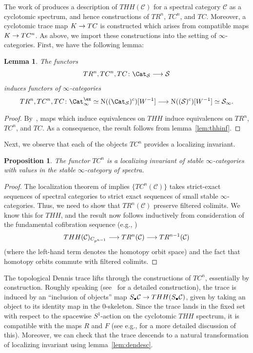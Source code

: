 \documentclass{amsart}
\newcommand{\ssdot}{\bullet}%
\newcommand{\Sdot}[1][\ssdot]{S_{#1}}
\newcommand{\htp}{\simeq}
\renewcommand{\to}{\mathchoice{\longrightarrow}{\rightarrow}{\rightarrow}{\rightarrow}}
\let\catsymbfont\mathcal
\newcommand{\aC}{{\catsymbfont{C}}}
\newcommand{\aS}{{\catsymbfont{S}}}
\newcommand{\N}{\mathrm{N}}
\newcommand{\stabcat}{\Cat_\i^{\ex}}
\newcommand{\ispec}{\aS_{\infty}}
\newcommand{\Spcat}{\Cat_\mathcal{S}}%
\newcommand{\Spt}{\mathcal{S}}%
\renewcommand{\i}{\infty}
\numberwithin{equation}{section}
\newtheorem{lemma}[equation]{Lemma}
\newtheorem{proposition}[equation]{Proposition}
\theoremstyle{definition}
\begin{document}
The work of \cite[\S 5]{BM} produces a description of $THH(\aC)$ for
a spectral category $\aC$ as a cyclotomic spectrum, and hence
constructions of $TR^n$, $TC^n$, and $TC$.  Moreover, a cyclotomic
trace map $K \to TC$ is constructed which arises from compatible maps
$K \to TC^n$.  As above, we import these constructions into the
setting of $\i$-categories.  First, we have the following lemma:

\begin{lemma}
The functors
\[
TR^n, TC^n, TC \colon \Spcat \to \Spt
\]
induces functors of $\i$-categories
\[
TR^n, TC^n, TC \colon \stabcat \htp \N((\Spcat)^{\mathrm{c}})[W^{-1}] \to \N((\Spt)^{\mathrm{c}})[W^{-1}] \htp \ispec.
\]
\end{lemma}

\begin{proof}
By~\cite[3.9]{BM}, maps which induce equivalences on $THH$ induce
equivalences on $TR^n$, $TC^n$, and $TC$.  As a consequence, the
result follows from lemma~\ref{lem:thhinf}. 
\end{proof}

Next, we observe that each of the objects $TC^{n}$ provides a
localizing invariant.

\begin{proposition}
The functor $TC^{n}$ is a localizing invariant of stable
$\i$-categories with values in the stable $\i$-category of spectra.
\end{proposition}

\begin{proof}
The localization theorem of \cite[7.1]{BM} implies $\{TC^{n}(\aC)\}$
takes strict-exact sequences of spectral categories to strict exact
sequences of small stable $\i$-categories.  Thus, we need to show that
$TR^n(\aC)$ preserve filtered colimits.  We know this for $THH$, and
the result now follows inductively from consideration of the
fundamental cofibration sequence (e.g., \cite[2.1.4]{Hesselholt})
\[
THH(\aC)_{C_{p^{n-1}}} \to TR^{n}(\aC) \to TR^{n-1}(\aC)
\]
(where the left-hand term denotes the homotopy orbit space) and the
fact that homotopy orbits commute with filtered colimits.
\end{proof}

The topological Dennis trace lifts through the constructions of
$TC^{n}$, essentially by construction.  Roughly speaking
(see~\cite[5.12]{BM2} for a detailed construction), the trace is
induced by an ``inclusion of objects'' map  $\Sdot \aC \to
THH(\Sdot \aC)$, given by taking an object to its identity map in the
0-skeleton.  Since the trace lands in the fixed set with respect
to the spacewise $S^1$-action on the cyclotomic $THH$ spectrum, it is
compatible with the maps $R$ and $F$ (see
e.g., \cite[1.2]{HesselholtMadsen} for a more detailed discussion of
this).  Moreover, we can check that the trace descends to a natural
transformation of localizing invariant using lemma~\ref{lem:dendesc}. 
\end{document}
